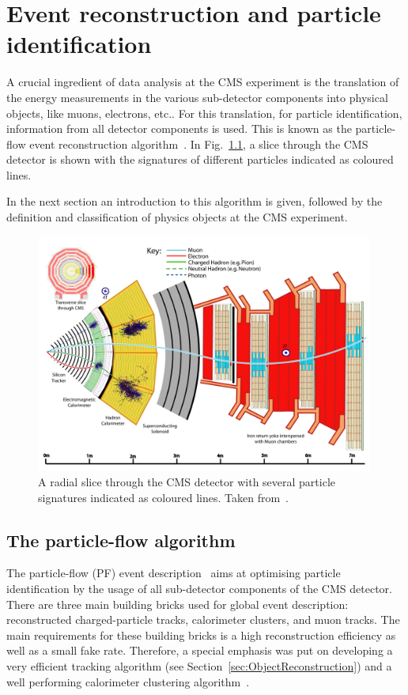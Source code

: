 \chapter{Event reconstruction and particle identification}
A crucial ingredient of data analysis at the CMS experiment is the translation of the energy measurements in the various sub-detector components into physical objects, like muons, electrons, etc..
For this translation, \ie for particle identification, information from all detector components is used.
This is known as the particle-flow event reconstruction algorithm~\cite{CMS-PAS-PFT-09-001}.
In Fig.~\ref{fig:CMSslice}, a slice through the CMS detector is shown with the signatures of different particles indicated as coloured lines.

In the next section an introduction to this algorithm is given, followed by the definition and classification of physics objects at the CMS experiment.
\begin{figure}[!ht]
  \centering
      \includegraphics[width=0.99\textwidth]{figures/experiment/ObjectReconstruction/slice_white_smaller_size.pdf}
  \caption{A radial slice through the CMS detector with several particle signatures indicated as coloured lines. Taken from~\cite{bib:Signatures_figure}.}  
  \label{fig:CMSslice}
\end{figure}


\section{The particle-flow algorithm}
\label{sec:PFalgorithm}
The particle-flow (PF) event description~\cite{CMS-PAS-PFT-09-001} aims at optimising particle identification by the usage of all sub-detector components of the CMS detector.
There are three main building bricks used for global event description: reconstructed charged-particle tracks, calorimeter clusters, and muon tracks.
The main requirements for these building bricks is a high reconstruction efficiency as well as a small fake rate.
Therefore, a special emphasis was put on developing a very efficient tracking algorithm (see Section~\ref{sec:ObjectReconstruction}) and a well performing calorimeter clustering algorithm~\cite{CMS-PAS-PFT-09-001}. 

